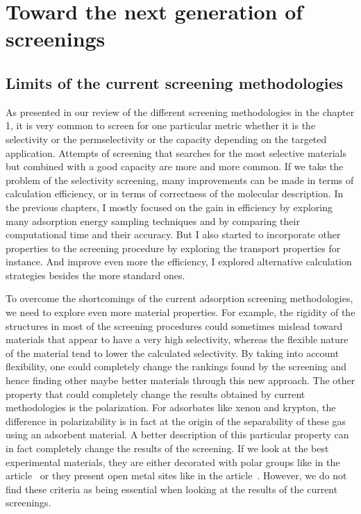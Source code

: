 \documentclass[main]{subfiles}
\begin{document}
\chapter{Toward the next generation of screenings}
\vspace*{-1\baselineskip}

\section{Limits of the current screening methodologies}

As presented in our review of the different screening methodologies in the chapter 1, it is very common to screen for one particular metric whether it is the selectivity or the permselectivity or the capacity depending on the targeted application. Attempts of screening that searches for the most selective materials but combined with a good capacity are more and more common.\autocite{Chung_2019,Zhang_2022,Solanki_2020} If we take the problem of the selectivity screening, many improvements can be made in terms of calculation efficiency, or in terms of correctness of the molecular description. In the previous chapters, I mostly focused on the gain in efficiency by exploring many adsorption energy sampling techniques and by comparing their computational time  and their accuracy. But I also started to incorporate other properties to the screening procedure by exploring the transport properties for instance. And improve even more the efficiency, I explored alternative calculation strategies besides the more standard ones. 

To overcome the shortcomings of the current adsorption screening methodologies, we need to explore even more material properties. For example, the rigidity of the structures in most of the screening procedures could sometimes mislead toward materials that appear to have a very high selectivity, whereas the flexible nature of the material tend to lower the calculated selectivity. By taking into account flexibility, one could completely change the rankings found by the screening and hence finding other maybe better materials through this new approach. The other property that could completely change the results obtained by current methodologies is the polarization. For adsorbates like xenon and krypton, the difference in polarizability is in fact at the origin of the separability of these gas using an adsorbent material. A better description of this particular property can in fact completely change the results of the screening. If we look at the best experimental materials, they are either decorated with polar groups like in the article~\cite{Li_2019} or they present open metal sites like in the article~\cite{Pei_2022}. However, we do not find these criteria as being essential when looking at the results of the current screenings. 
\end{document}
